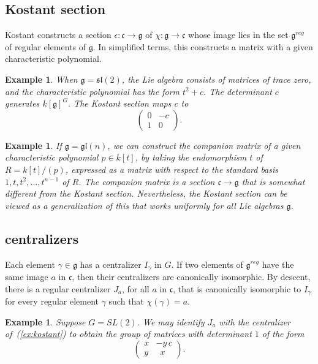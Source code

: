 \documentclass[brochure,english,12pt]{bourbaki}
\theoremstyle{plain}
\newtheorem{example}[equation]{Example}
\def\gl{\mathfrak{gl}}
\def\sl{\mathfrak{sl}}
\def\g{\mathfrak{g}}
\def\cc{\mathfrak{c}}
\begin{document}
\subsection{Kostant section}

Kostant constructs a section $\epsilon:\cc\to\g$ of $\chi:\g\to\cc$
whose image lies in the set $\g^{reg}$ of regular elements of $\g$.
In simplified terms, this constructs a matrix with a given
characteristic polynomial.


\begin{example}\label{ex:sl2}
  When $\g=\sl(2)$, the Lie algebra consists of matrices of trace zero, and the characteristic polynomial 
   has the form $t^2 +c$.  The determinant $c$ generates  $k[\g]^G$.  
  The Kostant section maps $c$ to
\begin{equation}\label{ex:kostant}
\begin{pmatrix} 0 & -c\\ 1 & 0\end{pmatrix}.
\end{equation}
\end{example}


\begin{example}
  If $\g=\gl(n)$, we can construct the companion matrix of a given
  characteristic polynomial $p\in k[t]$, by taking the endomorphism $t$ of
  $R=k[t]/(p)$, expressed as a matrix with respect to the standard
  basis $1,t,t^2,\ldots,t^{n-1}$ of $R$.  The companion matrix is a
  section $\cc\to\g$ that is somewhat different from the Kostant
  section.  Nevertheless, the Kostant section can be viewed as a
  generalization of this that works uniformly for all Lie algebras
  $\g$.
\end{example}


\subsection{centralizers}

Each element $\gamma\in\g$ has a centralizer $I_\gamma$ in $G$.
If two elements of $\g^{reg}$ have the same image $a$ in $\cc$, then
their centralizers are canonically isomorphic.  By descent, there is a
regular centralizer $J_a$, for all $a$ in $\cc$,  that is canonically isomorphic to
$I_\gamma$ for every regular element $\gamma$ such that
$\chi(\gamma)=a$.



\begin{example} Suppose $G=SL(2)$.
  We may identify $J_a$ with the centralizer of~(\ref{ex:kostant}) to obtain the
   group of matrices with determinant $1$ of the form
\[
\begin{pmatrix} x & -y\, c\\ y & \phantom{y}x
\end{pmatrix}.
\]
\end{example}
\end{document}
